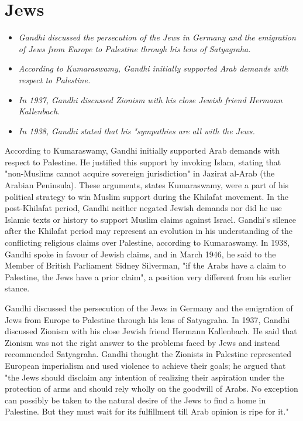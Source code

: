\section{Jews}\label{jews}

\begin{itemize}
\item
  \emph{Gandhi discussed the persecution of the Jews in Germany and the
  emigration of Jews from Europe to Palestine through his lens of
  Satyagraha.}
\item
  \emph{According to Kumaraswamy, Gandhi initially supported Arab
  demands with respect to Palestine.}
\item
  \emph{In 1937, Gandhi discussed Zionism with his close Jewish friend
  Hermann Kallenbach.}
\item
  \emph{In 1938, Gandhi stated that his "sympathies are all with the
  Jews.}
\end{itemize}

According to Kumaraswamy, Gandhi initially supported Arab demands with
respect to Palestine. He justified this support by invoking Islam,
stating that "non-Muslims cannot acquire sovereign jurisdiction" in
Jazirat al-Arab (the Arabian Peninsula). These arguments, states
Kumaraswamy, were a part of his political strategy to win Muslim support
during the Khilafat movement. In the post-Khilafat period, Gandhi
neither negated Jewish demands nor did he use Islamic texts or history
to support Muslim claims against Israel. Gandhi's silence after the
Khilafat period may represent an evolution in his understanding of the
conflicting religious claims over Palestine, according to Kumaraswamy.
In 1938, Gandhi spoke in favour of Jewish claims, and in March 1946, he
said to the Member of British Parliament Sidney Silverman, "if the Arabs
have a claim to Palestine, the Jews have a prior claim", a position very
different from his earlier stance.

Gandhi discussed the persecution of the Jews in Germany and the
emigration of Jews from Europe to Palestine through his lens of
Satyagraha. In 1937, Gandhi discussed Zionism with his close Jewish
friend Hermann Kallenbach. He said that Zionism was not the right answer
to the problems faced by Jews and instead recommended Satyagraha. Gandhi
thought the Zionists in Palestine represented European imperialism and
used violence to achieve their goals; he argued that "the Jews should
disclaim any intention of realizing their aspiration under the
protection of arms and should rely wholly on the goodwill of Arabs. No
exception can possibly be taken to the natural desire of the Jews to
find a home in Palestine. But they must wait for its fulfillment till
Arab opinion is ripe for it."

